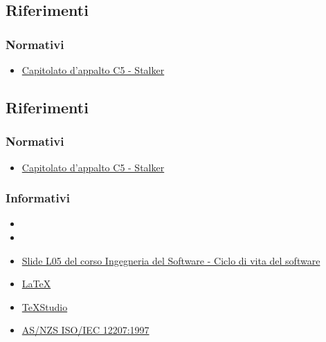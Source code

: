 \subsection{Riferimenti} 
\subsubsection{Normativi}
\begin{itemize}
	\item \href{https://www.math.unipd.it/~tullio/IS-1/2019/Progetto/C5.pdf}{Capitolato d'appalto C5 - Stalker}
\end{itemize}

\subsection{Riferimenti} 
\subsubsection{Normativi}
\begin{itemize}
	\item \href{https://www.math.unipd.it/~tullio/IS-1/2019/Progetto/C5.pdf}{Capitolato d'appalto C5 - Stalker}
\end{itemize}

\subsubsection{Informativi}
\begin{itemize}
	\item {}
	\item {}
	\item \href{https://www.math.unipd.it/~tullio/IS-1/2019/Dispense/L05.pdf}{Slide L05 del corso Ingegneria del Software - Ciclo di vita del software}
	\item \href{https://www.latex-project.org/help/documentation/}{\LaTeX}
	\item \href{https://www.texstudio.org/}{TeXStudio}
	\item \href{https://www.math.unipd.it/~tullio/IS-1/2009/Approfondimenti/ISO_12207-1995.pdf}{AS/NZS ISO/IEC 12207:1997}
\end{itemize}